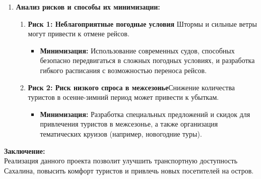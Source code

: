 \documentclass[a4paper,12pt]{article}
\begin{document}
\begin{enumerate}
    \item \textbf{Анализ рисков и способы их минимизации:}
    \begin{enumerate}
        \item \textbf{Риск 1: Неблагоприятные погодные условия} Штормы и сильные ветры могут привести к отмене рейсов.
        \begin{itemize}
            \item \textbf{Минимизация:} Использование современных судов, способных безопасно передвигаться в сложных погодных условиях, и разработка гибкого расписания с возможностью переноса рейсов.
        \end{itemize}
        \item \textbf{Риск 2: Риск низкого спроса в межсезонье}Снижение количества туристов в осенне-зимний период может привести к убыткам.
        \begin{itemize}
            \item \textbf{Минимизация:} Разработка специальных предложений и скидок для привлечения туристов в межсезонье, а также организация тематических круизов (например, новогодние туры).
        \end{itemize}
    \end{enumerate}
\end{enumerate}

\textbf{Заключение:} \\
Реализация данного проекта позволит улучшить транспортную доступность Сахалина, повысить комфорт туристов и привлечь новых посетителей на остров.
\end{document}
